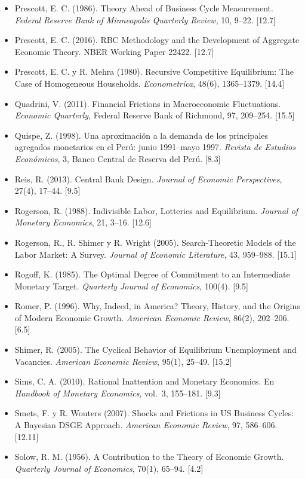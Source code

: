\documentclass[11pt,a4paper]{article}
\begin{document}
{\begin{itemize}[leftmargin=1.4em,itemsep=1pt,label={}]
\item Prescott, E. C. (1986). Theory Ahead of Business Cycle Measurement. \emph{Federal Reserve Bank of Minneapolis Quarterly Review}, 10, 9--22. [12.7]
\item Prescott, E. C. (2016). RBC Methodology and the Development of Aggregate Economic Theory. NBER Working Paper 22422. [12.7]
\item Prescott, E. C. y R. Mehra (1980). Recursive Competitive Equilibrium: The Case of Homogeneous Households. \emph{Econometrica}, 48(6), 1365--1379. [14.4]
\item Quadrini, V. (2011). Financial Frictions in Macroeconomic Fluctuations. \emph{Economic Quarterly}, Federal Reserve Bank of Richmond, 97, 209--254. [15.5]
\item Quispe, Z. (1998). Una aproximación a la demanda de los principales agregados monetarios en el Perú: junio 1991--mayo 1997. \emph{Revista de Estudios Económicos}, 3, Banco Central de Reserva del Perú. [8.3]
\item Reis, R. (2013). Central Bank Design. \emph{Journal of Economic Perspectives}, 27(4), 17--44. [9.5]
\item Rogerson, R. (1988). Indivisible Labor, Lotteries and Equilibrium. \emph{Journal of Monetary Economics}, 21, 3--16. [12.6]
\item Rogerson, R., R. Shimer y R. Wright (2005). Search-Theoretic Models of the Labor Market: A Survey. \emph{Journal of Economic Literature}, 43, 959--988. [15.1]
\item Rogoff, K. (1985). The Optimal Degree of Commitment to an Intermediate Monetary Target. \emph{Quarterly Journal of Economics}, 100(4). [9.5]
\item Romer, P. (1996). Why, Indeed, in America? Theory, History, and the Origins of Modern Economic Growth. \emph{American Economic Review}, 86(2), 202--206. [6.5]
\item Shimer, R. (2005). The Cyclical Behavior of Equilibrium Unemployment and Vacancies. \emph{American Economic Review}, 95(1), 25--49. [15.2]
\item Sims, C. A. (2010). Rational Inattention and Monetary Economics. En \emph{Handbook of Monetary Economics}, vol.~3, 155--181. [9.3]
\item Smets, F. y R. Wouters (2007). Shocks and Frictions in US Business Cycles: A Bayesian DSGE Approach. \emph{American Economic Review}, 97, 586--606. [12.11]
\item Solow, R. M. (1956). A Contribution to the Theory of Economic Growth. \emph{Quarterly Journal of Economics}, 70(1), 65--94. [4.2]

\end{itemize}}
\end{document}
